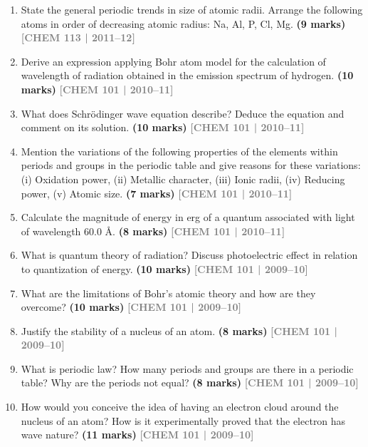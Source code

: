\documentclass[12pt,a3paper]{article}
\newcommand{\yr}[1]{\hfill\textcolor{gray}{\small\textbf{[#1]}}}
\newcommand{\mk}[1]{\textcolor{orange!70!black}{\small\textbf{(#1 marks)}}}
\begin{document}
\begin{enumerate}
\item State the general periodic trends in size of atomic radii. Arrange the following atoms in order of decreasing atomic radius: Na, Al, P, Cl, Mg. \mk{9}
\yr{CHEM 113 | 2011--12}



\item Derive an expression applying Bohr atom model for the calculation of wavelength of radiation obtained in the emission spectrum of hydrogen. \mk{10}
\yr{CHEM 101 | 2010--11}



\item What does Schr\"{o}dinger wave equation describe? Deduce the equation and comment on its solution. \mk{10}
\yr{CHEM 101 | 2010--11}



\item Mention the variations of the following properties of the elements within periods and groups in the periodic table and give reasons for these variations: (i) Oxidation power, (ii) Metallic character, (iii) Ionic radii, (iv) Reducing power, (v) Atomic size. \mk{7}
\yr{CHEM 101 | 2010--11}



\item Calculate the magnitude of energy in erg of a quantum associated with light of wavelength 60.0 \AA. \mk{8}
\yr{CHEM 101 | 2010--11}



\item What is quantum theory of radiation? Discuss photoelectric effect in relation to quantization of energy. \mk{10}
\yr{CHEM 101 | 2009--10}



\item What are the limitations of Bohr's atomic theory and how are they overcome? \mk{10}
\yr{CHEM 101 | 2009--10}



\item Justify the stability of a nucleus of an atom. \mk{8}
\yr{CHEM 101 | 2009--10}



\item What is periodic law? How many periods and groups are there in a periodic table? Why are the periods not equal? \mk{8}
\yr{CHEM 101 | 2009--10}



\item How would you conceive the idea of having an electron cloud around the nucleus of an atom? How is it experimentally proved that the electron has wave nature? \mk{11}
\yr{CHEM 101 | 2009--10}




\end{enumerate}
\end{document}
